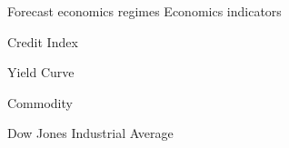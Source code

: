 \documentclass[final]{beamer}
\newlength{\sepwid}
\newlength{\onecolwid}
\begin{document}
\begin{frame}[t]
\begin{columns}[t]
\begin{column}{\onecolwid}
\begin{block}{Forecast economics regimes}
Economics indicators
\begin{enumerate}
\begin{multicols}{2}
\item Credit Index
\item Yield Curve
\item Commodity
\item Dow Jones Industrial Average
\end{multicols}

\end{enumerate}
\end{block}
\end{column}
\end{columns}
\end{frame}
\end{document}
